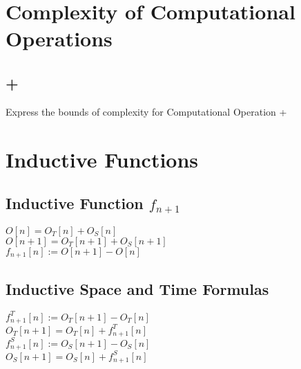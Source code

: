 \documentclass[11pt]{article}
\begin{document}
\section{Complexity of Computational Operations}
\subsection{+}
Express the bounds of complexity for Computational Operation +


\newpage
\section{Inductive Functions}














\subsection{Inductive Function $f_{n+1}$}
\begin{center}
\vspace{3mm}
$
O[n] = O_T[n] + O_S[n]
$
\\ \vspace{2mm}
$
O[n+1] = O_T[n+1] + O_S[n+1]
$
\\ \vspace{4mm}
$
f_{n+1}[n] := O[n+1] - O[n]
$
\end{center}










\subsection{Inductive Space and Time Formulas}
\begin{center}
$
f^T_{n+1}[n] := O_T[n+1] - O_T[n]
$
\\ \vspace{2mm}
$
O_T[n+1] = O_T[n] + f^T_{n+1}[n]
$
\\ \vspace{2mm}
$
f^S_{n+1}[n] := O_S[n+1] - O_S[n]
$
\\ \vspace{2mm}
$
O_S[n+1] = O_S[n] + f^S_{n+1}[n]
$

\end{center}
\end{document}
